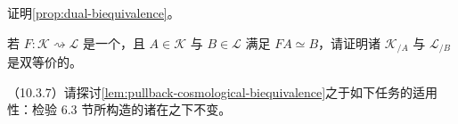 \begin{exercise}\label{ex:prove-dual-biequivalence}
证明\cref{prop:dual-biequivalence}。
\end{exercise}

\begin{exercise}\label{ex:slice-cosmoi-biequivalent}
若 $F\colon\mathcal{K}\rightsquigarrow\mathcal{L}$ 是一个\trBiequivalence，且 $A\in\mathcal{K}$ 与 $B\in\mathcal{L}$ 满足 $FA\simeq B$，请证明诸\trSliceInfinityCosmos{} $\mathcal{K}_{/A}$ 与 $\mathcal{L}_{/B}$ 是双等价的。
\end{exercise}

\begin{exercise}\label{ex:biequivalence-invariance}
（10.3.7）请探讨\cref{lem:pullback-cosmological-biequivalence}之于如下任务的适用性：检验 6.3 节所构造的诸\trInfinityCosmos{}在\trBiequivalence{}之下不变。
\end{exercise}

